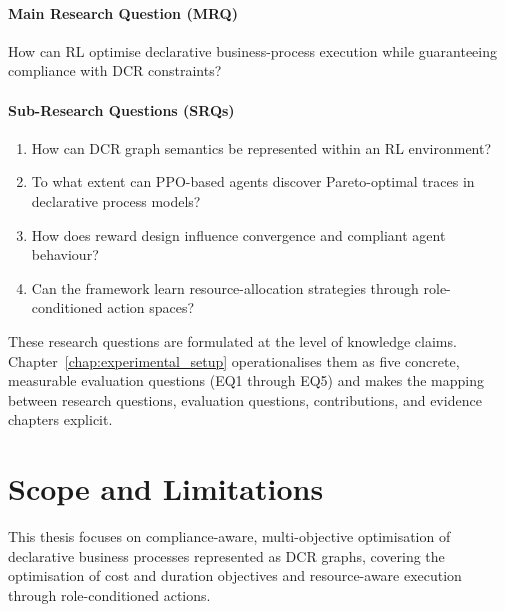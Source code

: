 \paragraph{Main Research Question (MRQ)}
How can \ac{RL} optimise declarative business-process execution while
guaranteeing compliance with \ac{DCR} constraints?

\paragraph{Sub-Research Questions (SRQs)}
\begin{enumerate}
    \item How can \ac{DCR} graph semantics be represented within an
    \ac{RL} environment?

    \item To what extent can \ac{PPO}-based agents discover
    Pareto-optimal traces in declarative process models?

    \item How does reward design influence convergence and compliant
    agent behaviour?

    \item Can the framework learn resource-allocation strategies through
    role-conditioned action spaces?
\end{enumerate}

These research questions are formulated at the level of knowledge
claims. Chapter~\ref{chap:experimental_setup} operationalises them as
five concrete, measurable evaluation questions (EQ1 through EQ5) and
makes the mapping between research questions, evaluation questions,
contributions, and evidence chapters explicit.

\section{Scope and Limitations}
\label{sec:scope}

This thesis focuses on compliance-aware, multi-objective optimisation of
declarative business processes represented as \ac{DCR} graphs, covering
the optimisation of cost and duration objectives and resource-aware
execution through role-conditioned actions.

